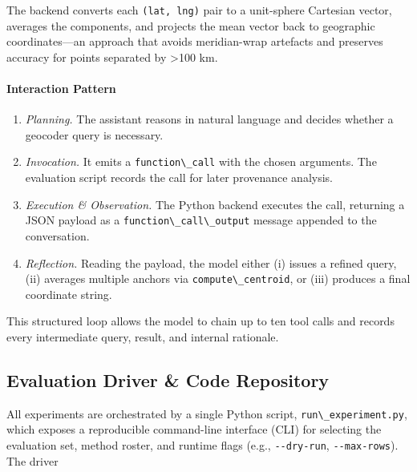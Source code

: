 The backend converts each \passthrough{\lstinline!(lat, lng)!} pair to a
unit-sphere Cartesian vector, averages the components, and projects the
mean vector back to geographic coordinates---an approach that avoids
meridian-wrap artefacts and preserves accuracy for points separated by
\textgreater100 km.

\paragraph{Interaction Pattern}\label{interaction-pattern}

\begin{enumerate}
\def\labelenumi{\arabic{enumi}.}
\tightlist
\item
  \emph{Planning.} The assistant reasons in natural language and decides
  whether a geocoder query is necessary.
\item
  \emph{Invocation.} It emits a \passthrough{\lstinline!function\_call!}
  with the chosen arguments. The evaluation script records the call for
  later provenance analysis.
\item
  \emph{Execution \& Observation.} The Python backend executes the call,
  returning a JSON payload as a
  \passthrough{\lstinline!function\_call\_output!} message appended to
  the conversation.
\item
  \emph{Reflection.} Reading the payload, the model either (i) issues a
  refined query, (ii) averages multiple anchors via
  \passthrough{\lstinline!compute\_centroid!}, or (iii) produces a final
  coordinate string.
\end{enumerate}

This structured loop allows the model to chain up to ten tool calls and
records every intermediate query, result, and internal rationale.

\subsection{Evaluation Driver \& Code
Repository}\label{a.5-evaluation-driver-code-repository}

All experiments are orchestrated by a single Python script,
\passthrough{\lstinline!run\_experiment.py!}, which exposes a
reproducible command-line interface (CLI) for selecting the evaluation
set, method roster, and runtime flags (e.g.,
\passthrough{\lstinline!--dry-run!},
\passthrough{\lstinline!--max-rows!}). The driver

